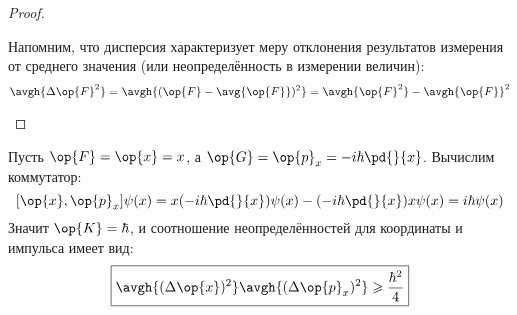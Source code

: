 \begin{proof}
\begin{enumerate}
Напомним, что дисперсия характеризует меру отклонения результатов измерения от среднего значения (или неопределённость в измерении величин):
$$
  \avgh{\Delta\op{F}^2} = \avgh{(\op{F}-\avg{\op{F}})^2} =
    \avgh{\op{F}^2}-\avgh{\op{F}}^2
$$
\end{enumerate}
\end{proof}

\begin{exmpl*} Пусть $\op{F}=\op{x}=x$, а $\op{G}=\op{p}_x=-i\hbar\pd{}{x}$. Вычислим коммутатор:
$$
  [\op{x}, \op{p}_x] \psi(x) =
    x (-i\hbar\pd{}{x})\psi(x) - (-i\hbar\pd{}{x}) x \psi(x) =
    i\hbar\psi(x)
$$%
%
Значит $\op{K}=\hbar$, и соотношение неопределённостей для координаты и импульса имеет вид:
$$
  \boxed{\avgh{(\Delta\op{x})^2}\avgh{(\Delta\op{p}_x)^2} \geqslant \frac{\hbar^2}{4}}
$$
\end{exmpl*}
